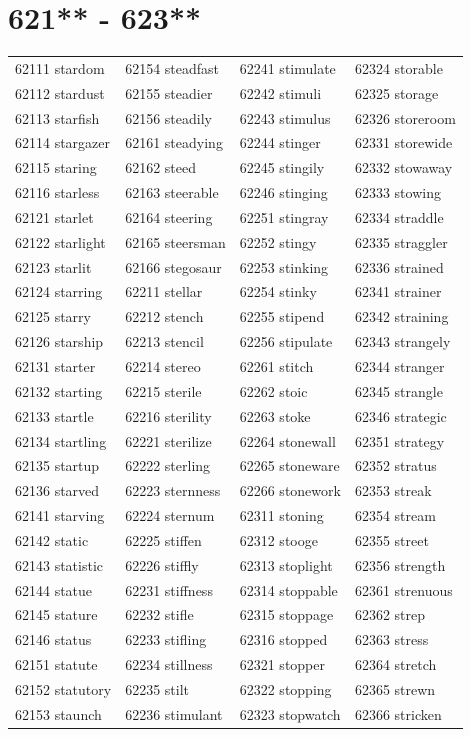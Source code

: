\documentclass[10pt, oneside]{book}
\begin{document}
\begin{table}
	\centering
	\section*{621** - 623**}
	\begin{tabular}{l l l l}
62111 stardom &62154 steadfast &62241 stimulate &62324 storable\\
62112 stardust &62155 steadier &62242 stimuli &62325 storage\\
62113 starfish &62156 steadily &62243 stimulus &62326 storeroom\\
62114 stargazer &62161 steadying &62244 stinger &62331 storewide\\
62115 staring &62162 steed &62245 stingily &62332 stowaway\\
62116 starless &62163 steerable &62246 stinging &62333 stowing\\
62121 starlet &62164 steering &62251 stingray &62334 straddle\\
62122 starlight &62165 steersman &62252 stingy &62335 straggler\\
62123 starlit &62166 stegosaur &62253 stinking &62336 strained\\
62124 starring &62211 stellar &62254 stinky &62341 strainer\\
62125 starry &62212 stench &62255 stipend &62342 straining\\
62126 starship &62213 stencil &62256 stipulate &62343 strangely\\
62131 starter &62214 stereo &62261 stitch &62344 stranger\\
62132 starting &62215 sterile &62262 stoic &62345 strangle\\
62133 startle &62216 sterility &62263 stoke &62346 strategic\\
62134 startling &62221 sterilize &62264 stonewall &62351 strategy\\
62135 startup &62222 sterling &62265 stoneware &62352 stratus\\
62136 starved &62223 sternness &62266 stonework &62353 streak\\
62141 starving &62224 sternum &62311 stoning &62354 stream\\
62142 static &62225 stiffen &62312 stooge &62355 street\\
62143 statistic &62226 stiffly &62313 stoplight &62356 strength\\
62144 statue &62231 stiffness &62314 stoppable &62361 strenuous\\
62145 stature &62232 stifle &62315 stoppage &62362 strep\\
62146 status &62233 stifling &62316 stopped &62363 stress\\
62151 statute &62234 stillness &62321 stopper &62364 stretch\\
62152 statutory &62235 stilt &62322 stopping &62365 strewn\\
62153 staunch &62236 stimulant &62323 stopwatch &62366 stricken\\
	\end{tabular}
 \end{table}
\clearpage
\end{document}
